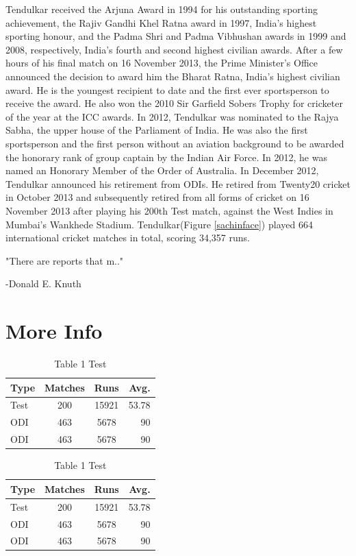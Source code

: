 \documentclass{report}
\begin{document}
Tendulkar received the Arjuna Award in 1994 for his outstanding sporting achievement, the Rajiv Gandhi Khel Ratna award in 1997, India's highest sporting honour, and the Padma Shri and Padma Vibhushan awards in 1999 and 2008, respectively, India's fourth and second highest civilian awards. After a few hours of his final match on 16 November 2013, the Prime Minister's Office announced the decision to award him the Bharat Ratna, India's highest civilian award. He is the youngest recipient to date and the first ever sportsperson to receive the award. He also won the 2010 Sir Garfield Sobers Trophy for cricketer of the year at the ICC awards. In 2012, Tendulkar was nominated to the Rajya Sabha, the upper house of the Parliament of India. He was also the first sportsperson and the first person without an aviation background to be awarded the honorary rank of group captain by the Indian Air Force. In 2012, he was named an Honorary Member of the Order of Australia.
\vspace{1cm}
In December 2012, Tendulkar announced his retirement from ODIs. He retired from Twenty20 cricket in October 2013 and subsequently retired from all forms of cricket on 16 November 2013 after playing his 200th Test match, against the West Indies in Mumbai's Wankhede Stadium. Tendulkar(Figure \ref{sachinface}) played 664 international cricket matches in total, scoring 34,357 runs.

"There are reports that m.."

\hfill{-Donald E. Knuth}

\section{More Info}
\begin{table}[H]
	\centering
\begin{tabular}{|l|c|c|r|}
	\hline
	\textbf{Type}&\textbf{Matches}&\textbf{Runs}&\textbf{Avg.}\\
	\hline \hline
	Test&200&15921&53.78\\
	\hline 
	ODI&463&5678&90 \\
	\hline
	ODI&463&5678&90 \\	
	\hline
\end{tabular}
\caption{Table 1 Test}
\label{cs}
\end{table}


\begin{table}[H]
	\centering
	\begin{tabular}{|l|c|c|r|}
		\hline
		\textbf{Type}&\textbf{Matches}&\textbf{Runs}&\textbf{Avg.}\\
		\hline \hline
		Test&200&15921&53.78\\
		\hline 
		ODI&463&5678&90 \\
		\hline
		ODI&463&5678&90 \\	
		\hline
	\end{tabular}
	\caption{Table 1 Test}
\end{table}
\end{document}
